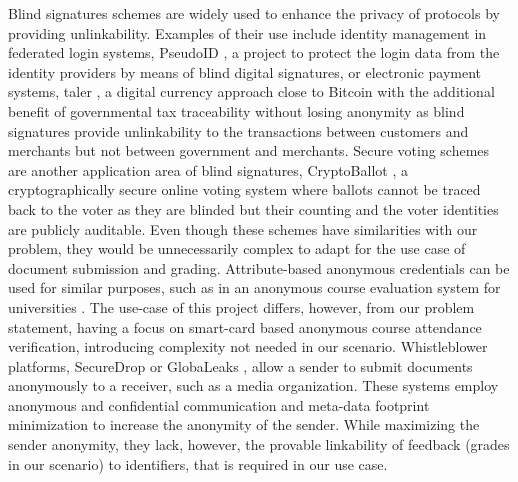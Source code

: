 Blind signatures schemes are widely used to
enhance the privacy of protocols by providing unlinkability. Examples 
of their use include identity management in federated login systems, \eg PseudoID 
\cite{DeyW10}, a project to protect the login data from the identity providers by 
means of blind digital signatures, 
or electronic payment systems, \eg \acs{taler} \cite{inria15}, a digital currency approach 
close to Bitcoin with the additional benefit of governmental tax traceability
without losing anonymity as blind signatures provide unlinkability to the transactions 
between customers and merchants but not between government and merchants. 
Secure voting schemes are another application area of blind signatures, 
\eg CryptoBallot \cite{Hayes13}, a cryptographically secure online voting system 
where ballots cannot be traced back to the voter as they are blinded but their counting 
and the voter identities are publicly auditable. Even though these
schemes have similarities with our problem, they would be unnecessarily
complex to adapt for the use case of document submission and grading.
%
Attribute-based anonymous credentials can be used for similar purposes,
such as in an anonymous course evaluation system for universities
\cite{StamatiouBGKLPT15}. The use-case of this project differs, however,
from our problem statement, having a focus on smart-card based anonymous
course attendance verification, introducing complexity not needed in our
scenario.
%
%
Whistleblower platforms, \eg SecureDrop \cite{fpf13} or
GlobaLeaks \cite{Hermes11}, allow a sender to submit documents
anonymously to a receiver, such as a media organization. These systems
employ anonymous and confidential communication and meta-data footprint
minimization to increase the anonymity of the sender. While maximizing
the sender anonymity, they lack, however, the provable linkability
of feedback (grades in our scenario) to identifiers, that is required in
our use case.

%



